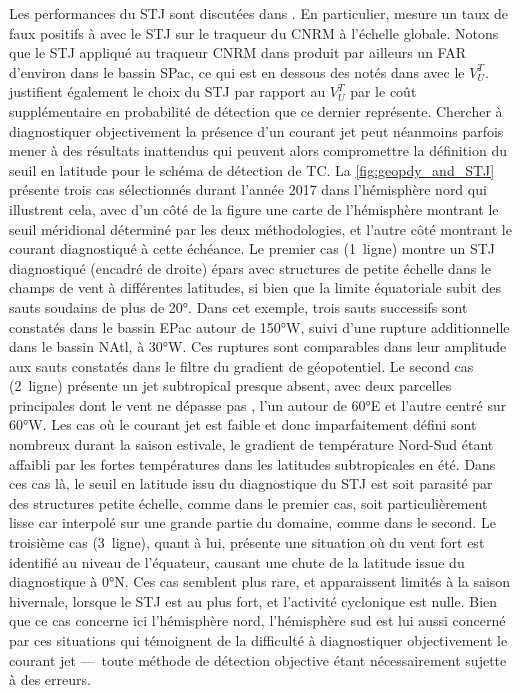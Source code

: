 \documentclass[../main.tex]{subfiles}
\begin{document}
Les performances du STJ sont discutées dans \textcite{bourdin_intercomparison_2022}. En particulier,
\textcite{bourdin_intercomparison_2022} mesure un taux de faux positifs à  avec le STJ sur le traqueur du CNRM à l'échelle globale. Notons que le STJ
appliqué au traqueur CNRM dans \textcite{bourdin_intercomparison_2022} produit par ailleurs un FAR d'environ  dans le bassin SPac, ce qui est en dessous
des  notés dans \textcite{dulac_assessing_2023} avec le $V_U^T$. \textcite{bourdin_intercomparison_2022} justifient également le choix du STJ par rapport au
$V_U^T$ par le coût supplémentaire en probabilité de détection que ce dernier représente. Chercher à diagnostiquer objectivement la présence d'un courant jet
peut néanmoins parfois mener à des résultats inattendus qui peuvent alors compromettre la définition du seuil en latitude pour le schéma de détection de TC. La
\cref{fig:geopdy_and_STJ} présente trois cas sélectionnés durant l'année 2017 dans l'hémisphère nord qui illustrent cela, avec d'un côté de la figure une carte
de l'hémisphère montrant le seuil méridional déterminé par les deux méthodologies, et l'autre côté montrant le courant diagnostiqué à cette échéance. Le premier
cas (1\iere~ligne) montre un STJ diagnostiqué (encadré de droite) épars avec structures de petite échelle dans le champs de vent à différentes latitudes, si bien que la limite
équatoriale subit des sauts soudains de plus de \ang{20}. Dans cet exemple, trois sauts successifs sont constatés dans le bassin EPac autour de \ang{150}W,
suivi d'une rupture additionnelle dans le bassin NAtl, à \ang{30}W. Ces ruptures sont comparables dans leur amplitude aux sauts constatés dans le filtre du
gradient de géopotentiel. Le second cas (2\ieme~ligne) présente un jet subtropical presque absent, avec deux parcelles principales dont le vent ne dépasse pas
, l'un autour de \ang{60}E et l'autre centré sur \ang{60}W. Les cas où le courant jet est faible et donc imparfaitement défini sont nombreux durant la
saison estivale, le gradient de température Nord-Sud étant affaibli par les fortes températures dans les latitudes subtropicales en été. Dans ces cas là, le
seuil en latitude issu du diagnostique du STJ est soit parasité par des structures petite échelle, comme dans le premier cas, soit particulièrement lisse car
interpolé sur une grande partie du domaine, comme dans le second. Le troisième cas (3\ieme~ligne), quant à lui, présente une situation où du vent fort est
identifié au niveau de l'équateur, causant une chute de la latitude issue du diagnostique à \ang{0}N. Ces cas semblent plus rare, et apparaissent limités à la
saison hivernale, lorsque le STJ est au plus fort, et l'activité cyclonique est nulle. Bien que ce cas concerne ici l'hémisphère nord, l'hémisphère sud est lui
aussi concerné par ces situations qui témoignent de la difficulté à diagnostiquer objectivement le courant jet ---~toute méthode de détection objective étant
nécessairement sujette à des erreurs.
\end{document}

